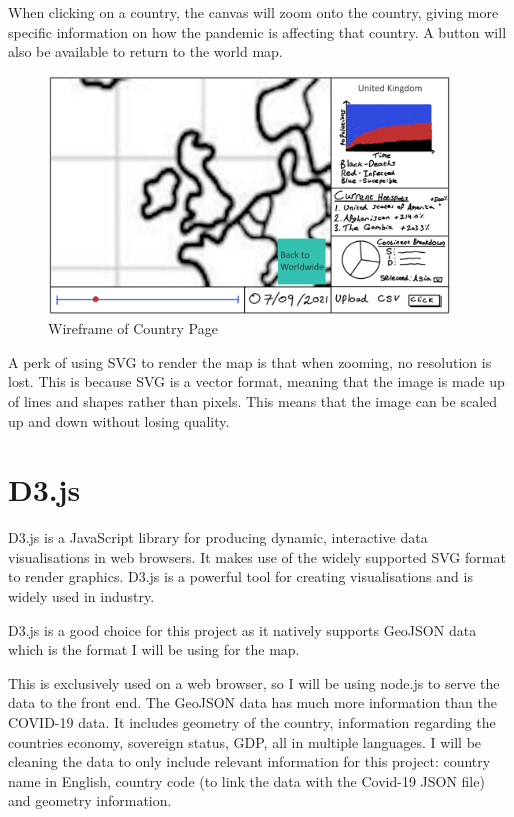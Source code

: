\documentclass{report}
\begin{document}
When clicking on a country, the canvas will zoom onto the country, giving more specific information on how the pandemic is affecting that country. A button will also be available to return to the world map.
\begin{center}
    \begin{figure}[h]
        \centering
        \includegraphics[width=0.95\textwidth]{Images/Country_Wireframe.png}
        \caption{Wireframe of Country Page}
        \label{fig:wireframe_country}
    \end{figure}
\end{center}
A perk of using SVG to render the map is that when zooming, no resolution is lost. This is because SVG is a vector format, meaning that the image is made up of lines and shapes rather than pixels. This means that the image can be scaled up and down without losing quality.
\section{D3.js}
D3.js is a JavaScript library for producing dynamic, interactive data visualisations in web browsers. It makes use of the widely supported SVG format to render graphics. D3.js is a powerful tool for creating visualisations and is widely used in industry.

D3.js is a good choice for this project as it natively supports GeoJSON data which is the format I will be using for the map. \cite{geojsonvectormaps}

This is exclusively used on a web browser, so I will be using node.js to serve the data to the front end.
\newpage
The GeoJSON data has much more information than the COVID-19 data. It includes geometry of the country, information regarding the countries economy, sovereign status, GDP, all in multiple languages. I will be cleaning the data to only include relevant information for this project: country name in English, country code (to link the data with the Covid-19 JSON file) and geometry information. 
\end{document}
